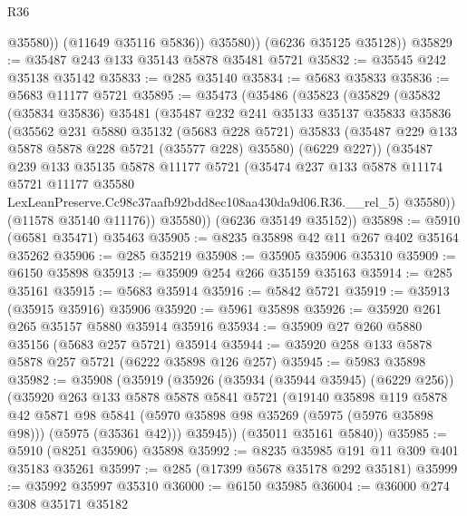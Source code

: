 \begin{lexlean}{R36}
\begin{coremodule}
                @35580))
            (@11649 @35116 @5836))
          @35580))
      (@6236 @35125 @35128))
@35829 := @35487 @243 @133 @35143 @5878 @35481 @5721
@35832 := @35545 @242 @35138 @35142
@35833 := @285 @35140
@35834 := @5683 @35833
@35836 := @5683 @11177 @5721
@35895 := @35473
    (@35486
      (@35823
        (@35829
          (@35832
            (@35834 @35836)
            @35481
            (@35487
              @232
              @241
              @35133
              @35137
              @35833
              @35836
              (@35562
                @231
                @5880
                @35132
                (@5683 @228 @5721)
                @35833
                (@35487 @229 @133 @5878 @5878 @228 @5721 (@35577 @228) @35580)
                (@6229 @227))
              (@35487
                @239
                @133
                @35135
                @5878
                @11177
                @5721
                (@35474
                  @237
                  @133
                  @5878
                  @11174
                  @5721
                  @11177
                  @35580
                  LexLeanPreserve.Cc98c37aafb92bdd8ec108aa430da9d06.R36.__rel_5)
                @35580))
            (@11578 @35140 @11176))
          @35580))
      (@6236 @35149 @35152))
@35898 := @5910 (@6581 @35471) @35463
@35905 := @8235 @35898 @42 @11 @267 @402 @35164 @35262
@35906 := @285 @35219
@35908 := @35905 @35906 @35310
@35909 := @6150 @35898
@35913 := @35909 @254 @266 @35159 @35163
@35914 := @285 @35161
@35915 := @5683 @35914
@35916 := @5842 @5721
@35919 := @35913 (@35915 @35916) @35906
@35920 := @5961 @35898
@35926 := @35920 @261 @265 @35157 @5880 @35914 @35916
@35934 := @35909 @27 @260 @5880 @35156 (@5683 @257 @5721) @35914
@35944 := @35920 @258 @133 @5878 @5878 @257 @5721 (@6222 @35898 @126 @257)
@35945 := @5983 @35898
@35982 := @35908
    (@35919
      (@35926
        (@35934 (@35944 @35945) (@6229 @256))
        (@35920
          @263
          @133
          @5878
          @5878
          @5841
          @5721
          (@19140
            @35898
            @119
            @5878
            @42
            @5871
            @98
            @5841
            (@5970 @35898 @98 @35269 (@5975 (@5976 @35898 @98)))
            (@5975 (@35361 @42)))
          @35945))
      (@35011 @35161 @5840))
@35985 := @5910 (@8251 @35906) @35898
@35992 := @8235 @35985 @191 @11 @309 @401 @35183 @35261
@35997 := @285 (@17399 @5678 @35178 @292 @35181)
@35999 := @35992 @35997 @35310
@36000 := @6150 @35985
@36004 := @36000 @274 @308 @35171 @35182

\end{coremodule}
\end{lexlean}
